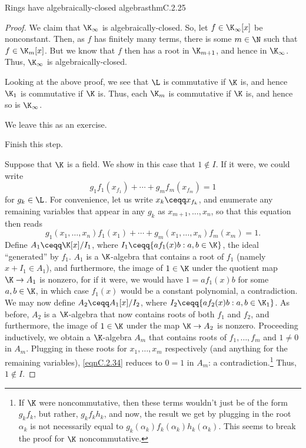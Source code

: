 \begin{thm}{Rings have algebraically-closed algebras}{thmC.2.25}
\begin{proof}
		We claim that $\K _{\infty}$ is algebraically-closed.  So, let $f\in \K _{\infty}[x]$ be nonconstant.  Then, as $f$ has finitely many terms, there is some $m\in \N$ such that $f\in \K _m[x]$.  But we know that $f$ then has a root in $\K _{m+1}$, and hence in $\K _{\infty}$.  Thus, $\K _{\infty}$ is algebraically-closed.
		
		Looking at the above proof, we see that $\L$ is commutative if $\K$ is, and hence $\K _1$ is commutative if $\K$ is.  Thus, each $\K _m$ is commutative if $\K$ is, and hence so is $\K _{\infty}$.
		
		We leave this as an exercise.
		\begin{exr}[breakable=false]{}{}
			Finish this step.
		\end{exr}
		
		Suppose that $\K$ is a field.  We show in this case that $1\notin I$.  If it were, we could write
		\begin{equation}
			g_1f_1(x_{f_1})+\cdots +g_mf_m(x_{f_m})=1
		\end{equation}
		for $g_k\in \L$.  For convenience, let us write $x_k\ceqq x_{f_k}$, and enumerate any remaining variables that appear in any $g_k$ as $x_{m+1},\ldots ,x_n$, so that this equation then reads
		\begin{equation}\label{eqnC.2.34}
			g_1(x_1,\ldots ,x_n)f_1(x_1)+\cdots +g_m(x_1,\ldots ,x_n)f_m(x_m)=1.
		\end{equation}
		Define $A_1\ceqq \K [x]/I_1$, where $I_1\ceqq \{ af_1(x)b:a,b\in \K \}$, the ideal ``generated'' by $f_1$.  $A_1$ is a $\K$-algebra that contains a root of $f_1$ (namely $x+I_1\in A_1$), and furthermore, the image of $1\in \K$ under the quotient map $\K \rightarrow A_1$ is nonzero, for if it were, we would have $1=af_1(x)b$ for some $a,b\in \K$, in which case $f_1(x)$ would be a constant polynomial, a contradiction.  We may now define $A_2\ceqq A_1[x]/I_2$, where $I_2\ceqq \{ af_2(x)b:a,b\in \K _1\}$.  As before, $A_2$ is a $\K$-algebra that now contains roots of both $f_1$ and $f_2$, and furthermore, the image of $1\in \K$ under the map $\K \rightarrow A_2$ is nonzero.  Proceeding inductively, we obtain a $\K$-algebra $A_m$ that contains roots of $f_1,\ldots ,f_m$ and $1\neq 0$ in $A_m$.  Plugging in these roots for $x_1,\ldots ,x_m$ respectively (and anything for the remaining variables), \eqref{eqnC.2.34} reduces to $0=1$ in $A_m$:  a contradiction.\footnote{If $\K$ were noncommutative, then these terms wouldn't just be of the form $g_kf_k$, but rather, $g_kf_kh_k$, and now, the result we get by plugging in the root $\alpha _k$ is not necessarily equal to $g_k(\alpha _k)f_k(\alpha _k)h_k(\alpha _k)$.  This seems to break the proof for $\K$ noncommutative.}  Thus, $1\notin I$.
		

\end{proof}
\end{thm}
